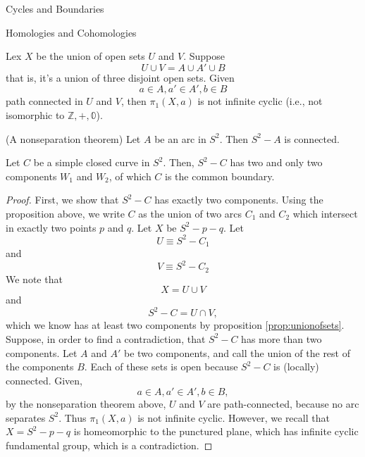\begin{subsubsection}{Cycles and Boundaries}
\begin{subsubsection}{Homologies and Cohomologies}
\begin{proposition}
  Lex $X$ be the union of open sets $U$ and $V$. Suppose
  \begin{equation}
  U\cup V = A\cup A'\cup B
  \end{equation}
  that is, it's a union of three disjoint open sets. Given
  \begin{equation}
    a\in A, a'\in A', b\in B
  \end{equation}
  path connected in $U$ and $V$, then $\pi_1(X,a)$ is not infinite cyclic
  (i.e., not isomorphic to $\mathbb{Z,+,0}$).
  \label{prop:unionofsets}
\end{proposition}
\begin{proposition}(A nonseparation theorem)
  Let $A$ be an arc in $S^2$. Then $S^2-A$ is connected.
\end{proposition}
\begin{proposition}
  Let $C$ be a simple closed curve in $S^2$. Then, $S^2-C$ has two and only
  two components $W_1$ and $W_2$, of which $C$ is the common boundary.
\end{proposition}
\begin{proof} First, we show that $S^2-C$ has exactly two components. Using
  the proposition above, we write $C$ as the union of two arcs $C_1$ and $C_2$
  which intersect in exactly two points $p$ and $q$. Let $X$ be $S^2-p-q$. Let
  \begin{equation}
  U \equiv S^2-C_1
  \end{equation}
  and 
  \begin{equation}
  V \equiv S^2-C_2
  \end{equation}
  We note that 
  \begin{equation}
  X = U\cup V
  \end{equation}
  and 
  \begin{equation}
    S^2-C = U\cap V,
  \end{equation}
  which we know has at least two components by proposition
  \ref{prop:unionofsets}. Suppose, in order to find a contradiction, that 
  $S^2-C$ has more than two components. Let $A$ and $A'$ be two components, 
  and call the union of the rest of the components $B$. Each of these sets is
  open because $S^2-C$ is (locally) connected. Given,
  \begin{equation}
    a\in A, a'\in A', b\in B,
  \end{equation}
  by the nonseparation theorem above, $U$ and $V$ are path-connected, because
  no arc separates $S^2$. Thus $\pi_1(X, a)$ is not infinite cyclic. However,
  we recall that $X=S^2-p-q$ is homeomorphic to the punctured plane, which
  has infinite cyclic fundamental group, which is a contradiction.


\end{proof}
\end{subsubsection}
\end{subsubsection}
